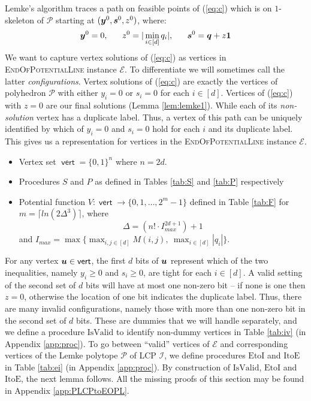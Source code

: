 \documentclass[a4paper,UKenglish]{lipics2}
\theoremstyle{definition}
\def\problem#1{\textsc{#1}}
\def\EOPL{\problem{EndOfPotentialLine}\xspace}
\def\ite{\mbox{ItoE}}
\def\eti{\mbox{EtoI}}
\def\pot{\mbox{$V$}}
\def\isvalid{\mbox{IsValid}}
\def\vert{\operatorname{\mathsf{vert}}}
\newcommand{\CPol}{\mbox{${\mathcal P}$}}
\newcommand{\CI}{\mbox{${\mathcal I}$}}
\newcommand{\CE}{\mbox{${\mathcal E}$}}
\newcommand{\yy}{\mbox{\boldmath $y$}}
\newcommand{\uu}{\mbox{\boldmath $u$}}
\newcommand{\qq}{\mbox{\boldmath $q$}}
\newcommand{\ones}{\mbox{\boldmath $1$}}
\newcommand{\ps}{\mbox{\boldmath $s$}}
\begin{document}
Lemke's algorithm traces a path on feasible points of (\ref{eq:c}) which is on
$1$-skeleton of $\CPol$ starting at $(\yy^0,\ps^0,z^0)$, where:
\begin{equation}\label{eq:v0}
\yy^0=0,\ \ \ \ \ z^0= |\min_{i \in [d]} q_i|,\ \ \ \ \  \ps^0=\qq+z\ones
\end{equation}
We want to capture
vertex solutions of (\ref{eq:c}) as vertices in \EOPL instance $\CE$. To
differentiate we will sometimes call the latter {\em configurations}. Vertex
solutions of (\ref{eq:c}) are exactly the vertices of polyhedron $\CPol$ with
either $y_i=0$ or $s_i=0$ for each $i\in [d]$. Vertices of (\ref{eq:c}) with
$z=0$ are our final solutions (Lemma \ref{lem:lemke1}). While each of its {\em
non-solution} vertex has a duplicate label. Thus, a vertex of this path can be
uniquely identified by which of $y_i=0$ and $s_i=0$ hold for each $i$ and its
duplicate label. This gives us a representation for vertices in the \EOPL
instance $\CE$. 

\medskip


\noindent{\bf \EOPL Instance $\CE$.}
\begin{itemize}
\item Vertex set $\vert=\{0,1\}^n$ where $n = 2d$. 
\item Procedures $S$ and $P$ as defined in Tables \ref{tab:S} and \ref{tab:P} respectively
\item Potential function $\pot:\vert \rightarrow \{0,1,\dots, 2^m-1\}$ defined in Table \ref{tab:F} for $m=\lceil ln(2\Delta^3)\rceil$, 
	  where $$\Delta=(n! \cdot I_{max}^{2d+1})+1$$ 
	  and $I_{max} = \max\{\max_{i,j\in [d]} M(i,j),\ \max_{i\in [d]} |q_i|\}$. 
\end{itemize}

For any vertex $\uu\in \vert$, the first $d$ bits of $\uu$ represent
which of the two inequalities, namely $y_i\ge 0$ and $s_i\ge 0$, are tight for
each $i \in [d]$. A valid setting of the second set of $d$ bits will have 
at most one non-zero bit -- if none is one then $z=0$, otherwise the location of one bit indicates the duplicate label. 
Thus, there are many invalid configurations, namely
those with more than one non-zero bit in the second set of $d$ bits. 
These are dummies that we will handle separately, and we define a procedure 
$\isvalid$ to identify non-dummy vertices in Table \ref{tab:iv} (in Appendix \ref{app:proc}). 
To go between ``valid'' vertices of $\CE$ and corresponding vertices of the Lemke polytope
$\CPol$ of LCP $\CI$, we define procedures $\eti$ and $\ite$ in Table
\ref{tab:ei} (in Appendix \ref{app:proc}).  
By construction of $\isvalid$, $\eti$ and $\ite$, the next lemma follows.
All the missing proofs of this section may be found in Appendix \ref{app:PLCPtoEOPL}.
\end{document}
